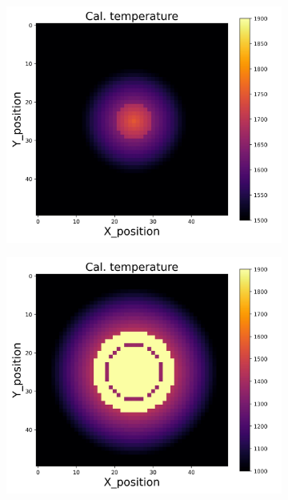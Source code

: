 {\begin{figure}[p]
\begin{minipage}{\textwidth}
\begin{subfigure}{0.325\textwidth}
        \end{subfigure}
        \begin{subfigure}{0.325\textwidth}
            \centering
            \includegraphics[width=\textwidth]{figures/raw_data/5/quad/T_cal.jpg}
        \end{subfigure}
        \begin{subfigure}{0.325\textwidth}
            \centering
            \includegraphics[width=\textwidth]{figures/raw_data/21/quad/T_cal.jpg}

\end{subfigure}
\end{minipage}
\end{figure}}
